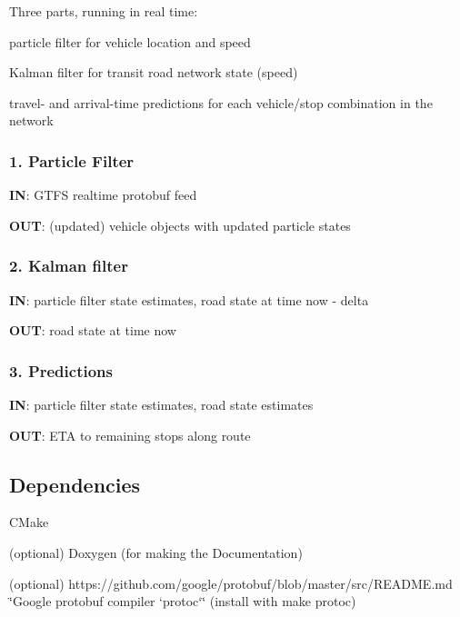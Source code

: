 Three parts, running in real time\+:
\begin{DoxyEnumerate}
\item particle filter for vehicle location and speed
\item Kalman filter for transit road network state (speed)
\item travel-\/ and arrival-\/time predictions for each vehicle/stop combination in the network
\end{DoxyEnumerate}

\subsubsection*{1. Particle Filter}

{\bfseries IN}\+: G\+T\+FS realtime protobuf feed

{\bfseries O\+UT}\+: (updated) vehicle objects with updated particle states

\subsubsection*{2. Kalman filter}

{\bfseries IN}\+: particle filter state estimates, road state at time {\ttfamily now -\/ delta}

{\bfseries O\+UT}\+: road state at time {\ttfamily now}

\subsubsection*{3. Predictions}

{\bfseries IN}\+: particle filter state estimates, road state estimates

{\bfseries O\+UT}\+: E\+TA to remaining stops along route



 \subsection*{Dependencies}


\begin{DoxyItemize}
\item C\+Make
\item (optional) Doxygen (for making the Documentation)
\item (optional) https\+://github.com/google/protobuf/blob/master/src/\+R\+E\+A\+D\+M\+E.\+md \char`\"{}\+Google protobuf compiler `protoc`\char`\"{} (install with {\ttfamily make protoc})
\end{DoxyItemize}

